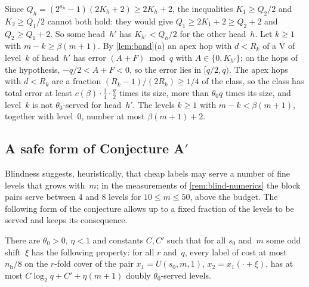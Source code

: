 \begin{informalproof}
Since $Q_h=(2^{a_h}-1)(2K_h+2)\ge2K_h+2$, the inequalities $K_1\ge Q_2/2$ and $K_2\ge Q_1/2$ cannot both hold: they would
give $Q_1\ge2K_1+2\ge Q_2+2$ and $Q_2\ge Q_1+2$. So some head~$h'$ has $K_{h'}<Q_h/2$ for the other head~$h$. Let $k\ge1$
with $m-k\ge\beta(m+1)$. By \cref{lem:band}(a) an apex hop with $d<R_k$ of a V of level~$k$ of head~$h'$ has error
$(A+F)\bmod q$ with $A\in\{0,K_{h'}\}$; on the hops of the hypothesis, $-q/2<A+F<0$, so the error lies in $[q/2,q)$. The
apex hops with $d<R_k$ are a fraction $(R_k-1)/(2R_k)\ge1/4$ of the class, so the class has total error at least
$c(\beta)\cdot\frac14\cdot\frac q2$ times its size, more than $\theta_0q$ times its size, and level~$k$ is not
$\theta_0$-served for head~$h'$. The levels $k\ge1$ with $m-k<\beta(m+1)$, together with level~$0$, number at most
$\beta(m+1)+2$.
\end{informalproof}

\subsection{A safe form of Conjecture A\texorpdfstring{$'$}{'}}\label{sec:dnp-App}

Blindness suggests, heuristically, that cheap labels may serve a number of fine levels that grows with~$m$; in the
measurements of \cref{rem:blind-numerics} the block pairs serve between $4$ and $8$ levels for $10\le m\le50$, above the
budget. The following form of the conjecture allows up to a fixed fraction of the levels to be served and keeps its
consequence.

\begin{conjecture}[Conjecture A$''$]\label{conj:App}
There are $\theta_0>0$, $\eta<1$ and constants $C,C'$ such that for all $s_0$ and~$m$ some odd shift~$\xi$ has the
following property: for all $r$ and~$q$, every label of cost at most $n_{\mathrm h}/8$ on the $r$-fold cover of the pair
$x_1=U(s_0,m,1)$, $x_2=x_1(\cdot+\xi)$, has at most $C\log_2q+C'+\eta(m+1)$ doubly $\theta_0$-served levels.
\end{conjecture}

